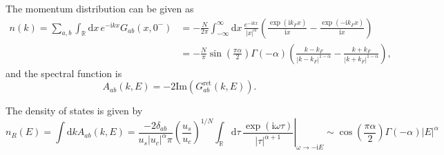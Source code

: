 \documentclass[10pt]{extarticle}
\newcommand{\ii}{\mathrm{i}}
\begin{document}
The momentum distribution can be given as
\[
\begin{aligned}
	n(k)=\sum_{a,b}\int_\mathbb{R} \mathrm{d}x\, e^{-\ii kx}G_{ab}(x,0^-)&=-\frac{N}{2\pi} \int_{-\infty}^\infty \mathrm{d}x\,\frac{e^{-\ii kx}}{|x|^\alpha}\left(\frac{\exp(\ii k_F x)}{\ii x}-\frac{\exp(-\ii k_F x)}{\ii x}\right)\\
	&=-\frac{N}{\pi}\sin \left(\frac{\pi  \alpha }{2}\right) \Gamma (-\alpha ) \left(\frac{k-k_F}{\left| k-k_F\right| ^{1-\alpha}}-\frac{k+k_F}{\left| k+k_F\right| ^{1-\alpha}}\right),
\end{aligned}
\]
and the spectral function is 
\[
	A_{ab}(k,E)=-2\mathrm{Im} \left(G^{\text{ret}}_{ab}(k,E)\right).
\]

The density of states is given by
\[
	n_R(E)=\int \mathrm{d}k A_{ab}(k,E)=\frac{-2\delta_{ab}}{u_s|u_c|^{\alpha}\pi}\left(\frac{u_s}{u_c}\right)^{1/N}\left.\int_{\mathbb{R}}\mathrm{d}\tau\,\frac{\exp(\ii \omega\tau)}{|\tau|^{\alpha+1}}\right|_{\omega\to -\ii E}\sim \cos \left(\frac{\pi \alpha}{2}\right) \Gamma (-\alpha) \left| E\right|^\alpha
\]
\end{document}
